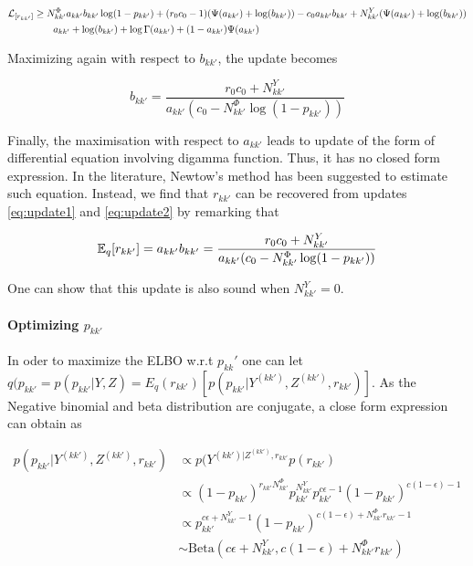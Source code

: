 \begin{align*}
\mathcal{L}_{[r_{kk'}]} &\geq N^\Phi_{kk'} a_{kk'} b_{kk'} \log(1-p_{kk'}) + (r_0 c_0-1 )(\Psi(a_{kk'}) + \log(b_{kk'})) -c_0 a_{kk'} b_{kk'} +N^Y_{kk'} (\Psi(a_{kk'}) + \log(b_{kk'}))  \\
&\qquad a_{kk'} + \log(b_{kk'}) +\log \Gamma(a_{kk'}) + (1-a_{kk'})\Psi(a_{kk'})
\end{align*}

Maximizing again with respect to $b_{kk'}$, the update becomes

\begin{equation} \label{eq:update2}
b_{kk'} = \frac{r_0 c_0 + N^Y_{kk'}}{a_{kk'} (c_0 - N^\Phi_{kk'} \log(1-p_{kk'}))}
\end{equation}

Finally, the maximisation with respect to $a_{kk'}$ leads to update of the form of differential equation involving digamma function. Thus, it has no closed form expression. In the literature, Newtow's method has been suggested to estimate such equation. Instead, we find that $r_{kk'}$ can be recovered from updates \eqref{eq:update1} and \eqref{eq:update2} by remarking that

\begin{equation}
\mathbb{E}_q[r_{kk'}] = a_{kk'} b_{kk'} = \frac{r_0 c_0 + N^Y_{kk'}}{a_{kk'} (c_0 - N^\Phi_{kk'} \log(1-p_{kk'}))}
\end{equation}


One can show that this update is also sound when $N^Y_{kk'} = 0$.


\paragraph{Optimizing $p_{kk'}$}

In oder to maximize the ELBO w.r.t $p_{kk}'$ one can let $q(p_{kk'} =p(p_{kk'} | Y,Z)=E_q(r_{kk'}) [ p(p_{kk'} | Y^{(kk')},Z^{(kk')} ,r_{kk'})]$. As the Negative binomial and beta distribution are conjugate, a close form expression can obtain as

\begin{align*}
p(p_{kk'} | Y^{(kk')}, Z^{(kk')}, r_{kk'}) &\propto p(Y^{(kk')| Z^{(kk')}, r_{kk'}} p(r_{kk'}) \\
                               &\propto (1-p_{kk'})^{r_{kk'} N^\Phi_{kk'}}p_{kk'}^{N^Y_{kk'}} p_{kk'}^{c\epsilon -1} (1-p_{kk'})^{c(1-\epsilon) -1}\\
                               &\propto p_{kk'}^{c\epsilon + N^Y_{kk'} -1} (1-p_{kk'})^{c(1-\epsilon) + N^\Phi_{kk'}r_{kk'}-1}\\
                               &\sim \mathrm{Beta}(c\epsilon + N^Y_{kk'}, c(1-\epsilon) + N^\Phi_{kk'}r_{kk'})
\end{align*}

